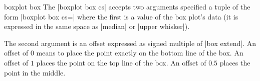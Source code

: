 \begin{coordinatesystem}{boxplot box}%
	The |boxplot box cs| accepts two arguments specified a tuple of the form
 |boxplot box cs=|
	where the first is a value of the box plot's data (it is expressed in the same space as |median| or |upper whisker|). 

	The second argument is an offset expressed as signed multiple of |box extend|. An offset of $0$ means to place the point exactly on the bottom line of the box. An offset of $1$ places the point on the top line of the box. An offset of $0.5$ places the point in the middle.

\begin{codeexample}[]
\end{codeexample}
\end{coordinatesystem}

